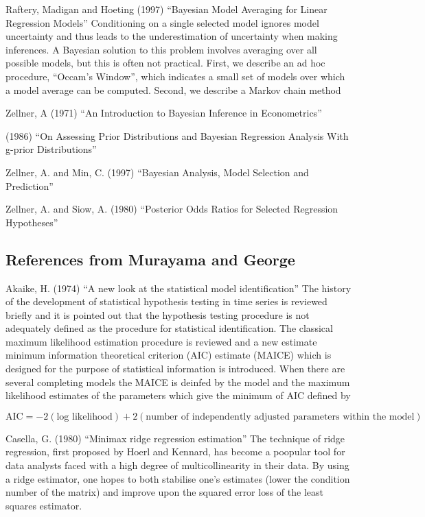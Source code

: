 \documentclass{amsart}[12pt]
\begin{document}
Raftery, Madigan and Hoeting (1997) ``Bayesian Model Averaging for Linear Regression Models''
Conditioning on a single selected model ignores model uncertainty and thus leads to the underestimation of
uncertainty when making inferences. A Bayesian solution to this problem involves averaging over all possible
models, but this is often not practical. First, we describe an ad hoc procedure, ``Occam's Window'', which
indicates a small set of models over which a model average can be computed. Second, we describe a Markov chain
method

Zellner, A (1971) ``An Introduction to Bayesian Inference in Econometrics''

(1986) ``On Assessing Prior Distributions and Bayesian Regression Analysis With g-prior Distributions''

Zellner, A. and Min, C. (1997) ``Bayesian Analysis, Model Selection and Prediction''

Zellner, A. and Siow, A. (1980) ``Posterior Odds Ratios for Selected Regression Hypotheses''

\subsection{References from Murayama and George}
Akaike, H. (1974) ``A new look at the statistical model identification''
The history of the development of statistical hypothesis testing in time series is reviewed briefly and it is
pointed out that the hypothesis testing procedure is not adequately defined as the procedure for statistical
identification. The classical maximum likelihood estimation procedure is reviewed and a new estimate minimum
information theoretical criterion (AIC) estimate (MAICE) which is designed for the purpose of statistical
information is introduced. When there are several completing models the MAICE is deinfed by the model and the
maximum likelihood estimates of the parameters which give the minimum of AIC defined by

\[
	\text{AIC} = -2 ( \text{log likelihood} ) + 2 (\text{number of independently adjusted parameters within the model})
\]

Casella, G. (1980) ``Minimax ridge regression estimation''
The technique of ridge regression, first proposed by Hoerl and Kennard, has become a poopular tool for data
analysts faced with a high degree of multicollinearity in their data. By using a ridge estimator, one hopes to
both stabilise one's estimates (lower the condition number of the matrix) and improve upon the squared error
loss of the least squares estimator.
\end{document}
